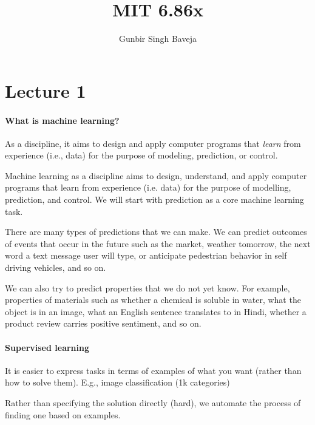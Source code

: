 \documentclass{scrartcl}
\title{MIT 6.86x}
\author{Gunbir Singh Baveja}
\begin{document}
\maketitle

\section{Lecture 1}
\paragraph{What is machine learning?}
As a discipline, it aims to design and apply computer 
programs that \textit{learn} from experience (i.e., data) 
for the purpose of modeling, prediction, or control.

\begin{remark}
Machine learning as a discipline aims to design, understand, and apply computer programs that learn from experience (i.e. data) for the purpose of modelling, prediction, and control. We will start with prediction as a core machine learning task.

There are many types of predictions that we can make. We can predict outcomes of events that occur in the future such as the market, weather tomorrow, the next word a text message user will type, or anticipate pedestrian behavior in self driving vehicles, and so on.

We can also try to predict properties that we do not yet know. For example, properties of materials such as whether a chemical is soluble in water, what the object is in an image, what an English sentence translates to in Hindi, whether a product review carries positive sentiment, and so on.

\end{remark}

\paragraph{Supervised learning}
It is easier to express tasks in terms of examples of what 
you want (rather than how to solve them). E.g., image classification (1k categories)

Rather than specifying the solution directly (hard), we automate the process of finding one based on examples.
\end{document}
